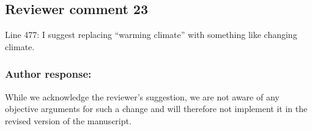 \subsection{Reviewer comment 23}

Line 477: I suggest replacing “warming climate” with something like changing climate.

\subsubsection{Author response:}

While we acknowledge the reviewer's suggestion, we are not aware of any
objective arguments for such a change and will therefore not implement it in the
revised version of the manuscript.
